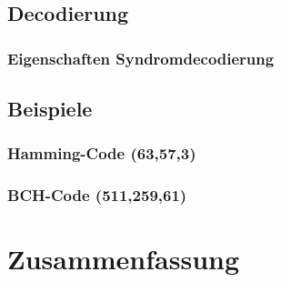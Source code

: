 \subsection{Decodierung}
\subsubsection*{Eigenschaften Syndromdecodierung}
\subsection{Beispiele}
\subsubsection*{Hamming-Code (63,57,3)}
\subsubsection*{BCH-Code (511,259,61)}

\section{Zusammenfassung}


